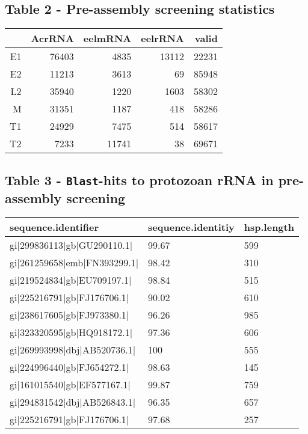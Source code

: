 \documentclass[10pt]{bmc_article}
\newenvironment{bmcformat}{\begin{raggedright}\baselineskip20pt\sloppy\setboolean{publ}{false}}{\end{raggedright}\baselineskip20pt\sloppy}
\begin{document}
\begin{bmcformat}
\subsection*{Table 2 - Pre-assembly screening statistics}
\begin{tabular}{rrrrr}
  \hline
 & AcrRNA & eelmRNA & eelrRNA & valid \\ 
  \hline
E1 & 76403 & 4835 & 13112 & 22231 \\ 
  E2 & 11213 & 3613 &  69 & 85948 \\ 
  L2 & 35940 & 1220 & 1603 & 58302 \\ 
  M & 31351 & 1187 & 418 & 58286 \\ 
  T1 & 24929 & 7475 & 514 & 58617 \\ 
  T2 & 7233 & 11741 &  38 & 69671 \\ 
   \hline
\end{tabular}
\subsection*{Table 3 - \texttt{Blast}-hits to protozoan rRNA in
  pre-assembly screening}
\begin{tabular}{lll}
  \hline
sequence.identifier & sequence.identitiy & hsp.length \\ 
  \hline
gi$|$299836113$|$gb$|$GU290110.1$|$ & 99.67 & 599 \\ 
  gi$|$261259658$|$emb$|$FN393299.1$|$ & 98.42 & 310 \\ 
  gi$|$219524834$|$gb$|$EU709197.1$|$ & 98.84 & 515 \\ 
  gi$|$225216791$|$gb$|$FJ176706.1$|$ & 90.02 & 610 \\ 
  gi$|$238617605$|$gb$|$FJ973380.1$|$ & 96.26 & 985 \\ 
  gi$|$323320595$|$gb$|$HQ918172.1$|$ & 97.36 & 606 \\ 
  gi$|$269993998$|$dbj$|$AB520736.1$|$ & 100 & 555 \\ 
  gi$|$224996440$|$gb$|$FJ654272.1$|$ & 98.63 & 145 \\ 
  gi$|$161015540$|$gb$|$EF577167.1$|$ & 99.87 & 759 \\ 
  gi$|$294831542$|$dbj$|$AB526843.1$|$ & 96.35 & 657 \\ 
  gi$|$225216791$|$gb$|$FJ176706.1$|$ & 97.68 & 257 \\ 
   \hline
\end{tabular}

\end{bmcformat}
\end{document}
